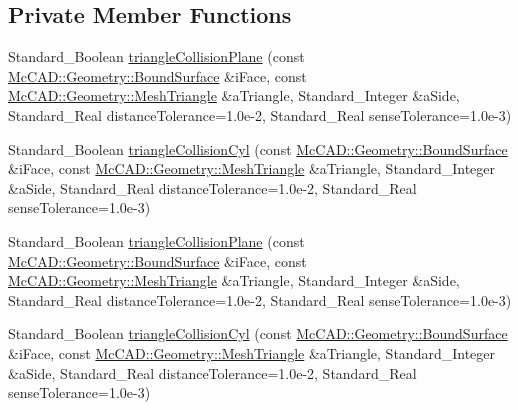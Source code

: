 \subsection*{Private Member Functions}
\begin{DoxyCompactItemize}
\item 
Standard\+\_\+\+Boolean \hyperlink{classMcCAD_1_1Decomposition_1_1TriangleCollision_aa9f5d8a29c70ea403e8a690108c31cc7}{triangle\+Collision\+Plane} (const \hyperlink{classMcCAD_1_1Geometry_1_1BoundSurface}{Mc\+C\+A\+D\+::\+Geometry\+::\+Bound\+Surface} \&i\+Face, const \hyperlink{classMcCAD_1_1Geometry_1_1MeshTriangle}{Mc\+C\+A\+D\+::\+Geometry\+::\+Mesh\+Triangle} \&a\+Triangle, Standard\+\_\+\+Integer \&a\+Side, Standard\+\_\+\+Real distance\+Tolerance=1.\+0e-\/2, Standard\+\_\+\+Real sense\+Tolerance=1.\+0e-\/3)
\item 
Standard\+\_\+\+Boolean \hyperlink{classMcCAD_1_1Decomposition_1_1TriangleCollision_a80f29dce3e63b4e8c6b54290260c1ca5}{triangle\+Collision\+Cyl} (const \hyperlink{classMcCAD_1_1Geometry_1_1BoundSurface}{Mc\+C\+A\+D\+::\+Geometry\+::\+Bound\+Surface} \&i\+Face, const \hyperlink{classMcCAD_1_1Geometry_1_1MeshTriangle}{Mc\+C\+A\+D\+::\+Geometry\+::\+Mesh\+Triangle} \&a\+Triangle, Standard\+\_\+\+Integer \&a\+Side, Standard\+\_\+\+Real distance\+Tolerance=1.\+0e-\/2, Standard\+\_\+\+Real sense\+Tolerance=1.\+0e-\/3)
\item 
Standard\+\_\+\+Boolean \hyperlink{classMcCAD_1_1Decomposition_1_1TriangleCollision_aa9f5d8a29c70ea403e8a690108c31cc7}{triangle\+Collision\+Plane} (const \hyperlink{classMcCAD_1_1Geometry_1_1BoundSurface}{Mc\+C\+A\+D\+::\+Geometry\+::\+Bound\+Surface} \&i\+Face, const \hyperlink{classMcCAD_1_1Geometry_1_1MeshTriangle}{Mc\+C\+A\+D\+::\+Geometry\+::\+Mesh\+Triangle} \&a\+Triangle, Standard\+\_\+\+Integer \&a\+Side, Standard\+\_\+\+Real distance\+Tolerance=1.\+0e-\/2, Standard\+\_\+\+Real sense\+Tolerance=1.\+0e-\/3)
\item 
Standard\+\_\+\+Boolean \hyperlink{classMcCAD_1_1Decomposition_1_1TriangleCollision_a80f29dce3e63b4e8c6b54290260c1ca5}{triangle\+Collision\+Cyl} (const \hyperlink{classMcCAD_1_1Geometry_1_1BoundSurface}{Mc\+C\+A\+D\+::\+Geometry\+::\+Bound\+Surface} \&i\+Face, const \hyperlink{classMcCAD_1_1Geometry_1_1MeshTriangle}{Mc\+C\+A\+D\+::\+Geometry\+::\+Mesh\+Triangle} \&a\+Triangle, Standard\+\_\+\+Integer \&a\+Side, Standard\+\_\+\+Real distance\+Tolerance=1.\+0e-\/2, Standard\+\_\+\+Real sense\+Tolerance=1.\+0e-\/3)
\end{DoxyCompactItemize}


